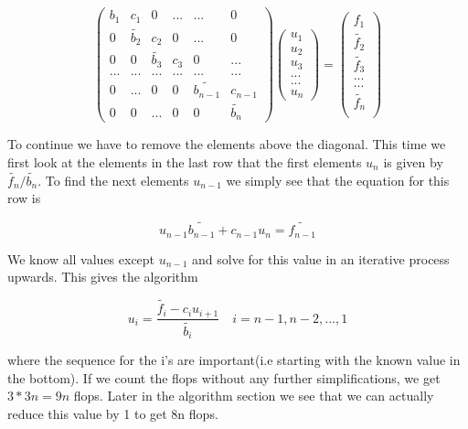 \documentclass[a4paper,11pt]{article}
\begin{document}
{\begin{equation}
\begin{pmatrix}
b_1 & c_1 & 0 & ... & ... & 0 \\
0 & \tilde{b_2} & c_2 & 0 & ... & 0 \\
0 & 0 & \tilde{b_3} & c_3 & 0 & ... \\
... & ... & ... & ... & ... & ... \\
0 & ... & 0 & 0 & \tilde{b_{n-1}} & c_{n-1} \\
0 & 0 & ... & 0 & 0 & \tilde{b_{n}}
\end{pmatrix} \begin{pmatrix}
u_1\\
u_2\\
u_3\\
...\\
...\\
u_n
\end{pmatrix} = \begin{pmatrix}
f_1 \\
\tilde{f_2} \\
\tilde{f_3} \\
... \\
... \\
\tilde{f_n} \\
\end{pmatrix}
\end{equation}
		
To continue we have to remove the elements above the diagonal. This time we first look at the elements in the last row that the first elements $u_n$ is given by $\tilde{f_n}/\tilde{b_n}$. To find the next elements $u_{n-1}$ we simply see that the equation for this row is 
		
\begin{equation}
u_{n-1}\tilde{b_{n-1}}+c_{n-1}u_n = \tilde{f_{n-1}}
\end{equation}
		
We know all values except $u_{n-1}$ and solve for this value in an iterative process upwards. This gives the algorithm 
		
\begin{equation}
u_i = \frac{\tilde{f_i}-c_i u_{i+1}}{\tilde{b_i}}\quad i = n-1, n-2, ..., 1
\label{eq:forward_general_u}
\end{equation}
	
where the sequence for the i's are important(i.e starting with the known value in the bottom). If we count the flops without any further simplifications, we get $3*3n=9n$ flops. Later in the algorithm section we see that we can actually reduce this value by 1 to get 8n flops. 
		
}
\end{document}
